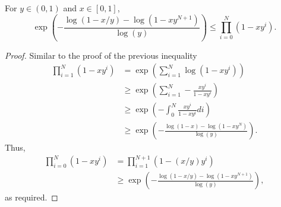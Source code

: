 \begin{lem}
For $y\in(0,1)$ and $x\in[0,1]$,
\[
\exp\left(-\frac{\log(1-x/y)-\log(1-xy^{N+1})}{\log(y)}\right)\leq\prod_{i=0}^{N}(1-xy^{i}).
\]
\end{lem}
\begin{proof}
Similar to the proof of the previous inequality
\begin{align*}
\prod_{i=1}^{N}(1-xy^{i}) & =\exp\left(\sum_{i=1}^{N}\log\left(1-xy^{i}\right)\right)\\
 & \geq\exp\left(\sum_{i=1}^{N}-\frac{xy^{i}}{1-xy^{i}}\right)\\
 & \geq\exp\left(-\int_{0}^{N}\frac{xy^{i}}{1-xy^{i}}di\right)\\
 & \geq\exp\left(-\frac{\log(1-x)-\log\left(1-xy^{N}\right)}{\log(y)}\right).
\end{align*}
Thus,
\begin{align*}
\prod_{i=0}^{N}(1-xy^{i}) & =\prod_{i=1}^{N+1}(1-(x/y)y^{i})\\
 & \geq\exp\left(-\frac{\log(1-x/y)-\log(1-xy^{N+1})}{\log(y)}\right),
\end{align*}
as required.
\end{proof}


